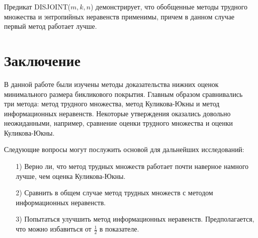\documentclass[a4paper]{article}
\begin{document}
Предикат DISJOINT($m,k,n$) демонстрирует, что обобщенные методы трудного множества и энтропийных неравенств применимы, 
причем в данном случае первый метод работает лучше. 

\addtocounter{section}{1}
\section*{Заключение}
В данной работе были изучены методы доказательства нижних оценок минимального размера бикликового покрытия. 
Главным образом сравнивались три метода: метод трудного множества, метод Куликова-Юкны и метод 
информационных неравенств. Некоторые утверждения оказались довольно неожиданными, например, сравнение 
оценки трудного множества и оценки Куликова-Юкны. 

Следующие вопросы могут послужить основой для дальнейших исследований:
\begin{itemize}[noitemsep]
    \item[1)] Верно ли, что метод трудных множеств работает почти наверное намного лучше, чем оценка Куликова-Юкны.
    \item[2)] Сравнить в общем случае метод трудных множеств с методом информационных неравенств.
    \item[3)] Попытаться улучшить метод информационных неравенств. Предполагается, что можно избавиться 
    от $\frac{1}{2}$ в показателе.
\end{itemize}


\newpage



\end{document}
